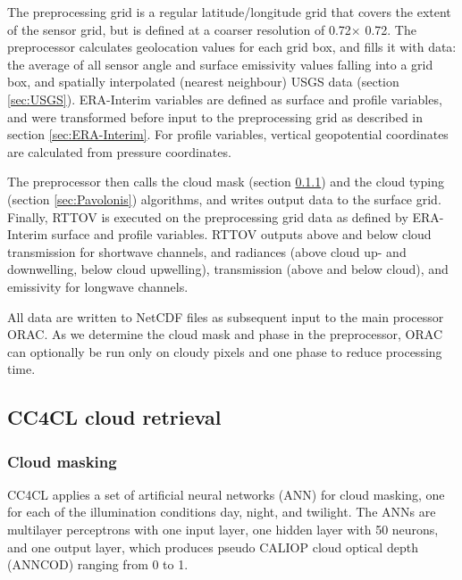 The preprocessing grid is a regular latitude/longitude grid that covers the extent of the sensor grid, but is defined at a coarser resolution of 0.72\textdegree $\times$ 0.72\textdegree. The preprocessor calculates geolocation values for each grid box, and fills it with data: the average of all sensor angle and surface emissivity values falling into a grid box, and spatially interpolated (nearest neighbour) USGS data (section \ref{sec:USGS}). ERA-Interim variables are defined as surface and profile variables, and were transformed before input to the preprocessing grid as described in section \ref{sec:ERA-Interim}. For profile variables, vertical geopotential coordinates are calculated from pressure coordinates.

The preprocessor then calls the cloud mask (section \ref{sec:CloudMask}) and the cloud typing (section \ref{sec:Pavolonis}) algorithms, and writes output data to the surface grid. Finally, RTTOV is executed on the preprocessing grid data as defined by ERA-Interim surface and profile variables. RTTOV outputs above and below cloud transmission for shortwave channels, and radiances (above cloud up- and downwelling, below cloud upwelling), transmission (above and below cloud), and emissivity for longwave channels.

All data are written to NetCDF files as subsequent input to the main processor ORAC. As we determine the cloud mask and phase in the preprocessor, ORAC can optionally be run only on cloudy pixels and one phase to reduce processing time.

\subsection{CC4CL cloud retrieval}

\subsubsection{Cloud masking}\label{sec:CloudMask}

CC4CL applies a set of artificial neural networks (ANN) for cloud masking, one for each of the illumination conditions day, night, and twilight. The ANNs are multilayer perceptrons with one input layer, one hidden layer with 50 neurons, and one output layer, which produces pseudo CALIOP cloud optical depth (ANNCOD) ranging from 0 to 1.

